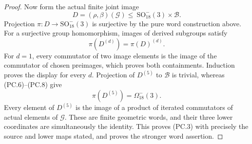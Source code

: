 \begin{proof}
Now form the actual finite joint image
\[
 D=(\rho,\beta)(\mathcal G)
     \le\ \mathrm{SO}_{18}^-(3)\times\mathcal B.
 \tag{PC.7}
\]
Projection \(\pi:D\to\mathrm{SO}_{18}^-(3)\) is
surjective by the pure word construction above.
For a surjective group homomorphism, images of derived
subgroups satisfy
\[
                  \pi(D^{(d)})=\pi(D)^{(d)}.
 \tag{PC.8}
\]
For \(d=1\), every commutator of two image elements
is the image of the commutator of chosen preimages,
which proves both containments. Induction proves the
display for every \(d\).
Projection of \(D^{(5)}\) to \(\mathcal B\) is trivial,
whereas (PC.6)--(PC.8) give
\[
            \pi(D^{(5)})=\Omega_{18}^-(3).
 \tag{PC.9}
\]
Every element of \(D^{(5)}\) is the image of a product
of iterated commutators of actual elements of
\(\mathcal G\). These are finite geometric words,
and their three lower coordinates are simultaneously
the identity. This proves (PC.3) with precisely the
source and lower maps stated, and proves the stronger
word assertion.
\end{proof}
